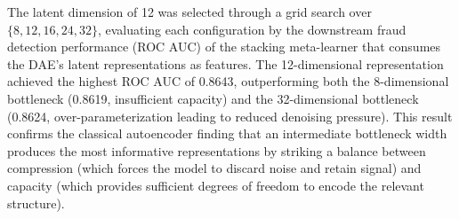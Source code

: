 The latent dimension of 12 was selected through a grid search over $\{8, 12, 16, 24, 32\}$, evaluating each configuration by the downstream fraud detection performance (ROC AUC) of the stacking meta-learner that consumes the DAE's latent representations as features. The 12-dimensional representation achieved the highest ROC AUC of 0.8643, outperforming both the 8-dimensional bottleneck (0.8619, insufficient capacity) and the 32-dimensional bottleneck (0.8624, over-parameterization leading to reduced denoising pressure). This result confirms the classical autoencoder finding that an intermediate bottleneck width produces the most informative representations by striking a balance between compression (which forces the model to discard noise and retain signal) and capacity (which provides sufficient degrees of freedom to encode the relevant structure).
